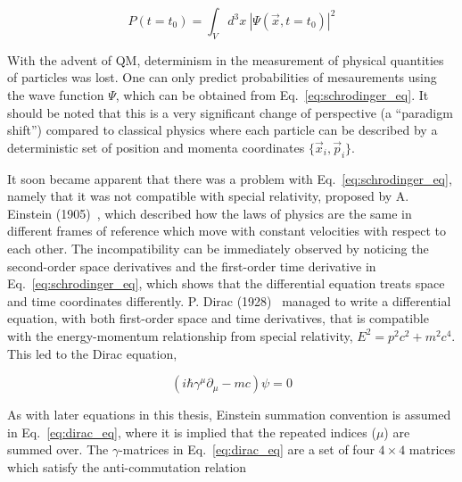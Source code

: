 \begin{equation}
    P(t=t_0)  = \int_{V} d^3 x \ |\Psi(\vec{x}, t=t_0)|^2 
\end{equation}

With the advent of QM, determinism in the measurement of physical quantities of particles was lost.
One can only predict probabilities of mesaurements using the wave function $\Psi$, which can
be obtained from Eq.~\ref{eq:schrodinger_eq}. It should be noted that this is a very significant change 
of perspective (a ``paradigm shift'') compared to classical physics where each particle can be described
by a deterministic set of position and momenta coordinates $\{\vec{x}_i, \vec{p}_i\}$. 

It soon became apparent that there was a problem with Eq.~\ref{eq:schrodinger_eq}, namely that it was not compatible
with special relativity, proposed by A. Einstein (1905)~\cite{Einstein:1905ve}, 
which described how the laws of physics are the same
in different frames of reference which move with constant velocities with respect to each other. The incompatibility
can be immediately observed by noticing the second-order space derivatives and the first-order time derivative in
Eq.~\ref{eq:schrodinger_eq}, which shows that the differential equation treats space and time coordinates differently.
P. Dirac (1928)~\cite{Dirac:1928hu} managed to write a differential equation, with both first-order space and 
time derivatives, that is compatible
with the energy-momentum relationship from special relativity, $E^2 = p^2 c^2 + m^2 c^4$. This led to the Dirac equation,

\begin{equation}
    \left( i\hbar \gamma^{\mu} \partial_{\mu} - mc \right) \psi = 0
    \label{eq:dirac_eq}
\end{equation}

As with later equations in this thesis, Einstein summation convention is assumed in Eq.~\ref{eq:dirac_eq},
where it is implied that the repeated indices ($\mu$) are summed over.
The $\gamma$-matrices in Eq.~\ref{eq:dirac_eq} are a set of four $4\times 4$ matrices 
which satisfy the anti-commutation relation

